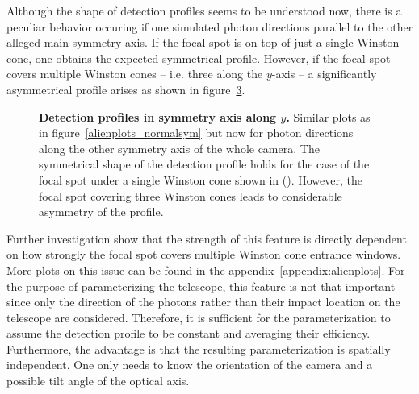 Although the shape of detection profiles seems to be understood now, there is a peculiar behavior occuring if one simulated photon directions parallel to the other alleged main symmetry axis. If the focal spot is on top of just a single Winston cone, one obtains the expected symmetrical profile. However, if the focal spot covers multiple Winston cones -- i.e. three along the $y$-axis -- a significantly asymmetrical profile arises as shown in figure~\ref{alienplots_strangesym}.\\

\begin{figure}[H]
	\centering
	\begin{subfigure}[t]{0.492\textwidth}
		\label{alienplots_strangesym:1}
	\end{subfigure}
	\hfill
	\begin{subfigure}[t]{0.492\textwidth}
		\label{alienplots_strangesym:2}
	\end{subfigure}
	\caption[Detection profiles in symmetry axis along $x$]{\textbf{Detection profiles in symmetry axis along $y$.} Similar plots as in figure~\ref{alienplots_normalsym} but now for photon directions along the other symmetry axis of the whole camera. The symmetrical shape of the detection profile holds for the case of the focal spot under a single Winston cone shown in (). However, the focal spot covering three Winston cones leads to considerable asymmetry of the profile.}
	\label{alienplots_strangesym}
\end{figure}

Further investigation show that the strength of this feature is directly dependent on how strongly the focal spot covers multiple Winston cone entrance windows. More plots on this issue can be found in the appendix~\ref{appendix:alienplots}.
For the purpose of parameterizing the \iceact telescope, this feature is not that important since only the direction of the photons rather than their impact location on the telescope are considered. Therefore, it is sufficient for the parameterization to assume the detection profile to be constant and averaging their efficiency. Furthermore, the advantage is that the resulting parameterization is spatially independent. One only needs to know the orientation of the camera and a possible tilt angle of the optical axis.\\
\newpage

